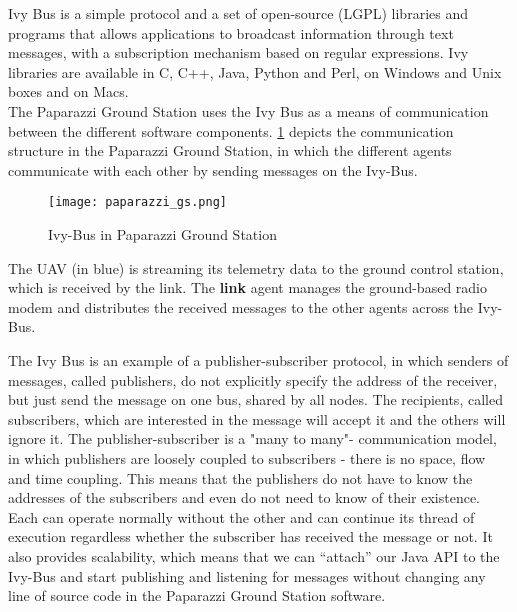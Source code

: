 Ivy Bus is a simple protocol and a set of open-source (LGPL) libraries and programs that allows applications to broadcast information through text messages, with a subscription mechanism based on regular expressions. 
Ivy libraries are available in C, C++, Java, Python and Perl, on Windows and Unix boxes and on Macs. \\

The Paparazzi Ground Station uses the Ivy Bus as a means of communication between the different software components. 
 \ref{fig:paparazziGS} depicts the communication structure in the Paparazzi Ground Station, in which the different agents communicate with each other by sending messages on the Ivy-Bus.

\begin{figure}[h!]
 \begin{center}
  \texttt{[image: paparazzi\_gs.png]}
 \end{center}
  \caption{Ivy-Bus in Paparazzi Ground Station\label{fig:paparazziGS}}
\end{figure}

The \gls{UAV} (in blue) is streaming its telemetry data to the ground control station, which is received by the link. The \textbf{link} agent manages the ground-based radio modem and distributes the received messages to the other agents across the Ivy-Bus.

The Ivy Bus is an example of a publisher-subscriber protocol, in which senders of messages, called publishers, do not  explicitly specify the address of the receiver, but just send the message on one bus, shared by all nodes. 
The recipients, called subscribers, which are interested in the message will accept it and the others will ignore it. 
The publisher-subscriber is a "many to many"- communication model, in which publishers are loosely coupled to subscribers - there is no space, flow and time coupling. 
This means that the publishers do not have to know the addresses of the subscribers and even do not need to know of their existence. 
Each can operate normally without the other and can continue its thread of execution regardless whether the subscriber has received the message or not. 
It also provides scalability, which means that we can “attach” our Java API to the Ivy-Bus and start publishing and listening for messages without changing any line of source code in the Paparazzi Ground Station software.

